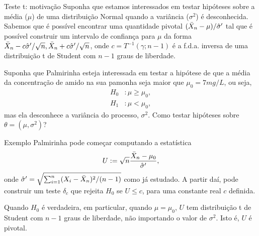 \begin{frame}{Teste t: motivação}
 Suponha que estamos interessados em testar hipóteses sobre a média ($\mu$) de uma distribuição Normal quando a variância ($\sigma^2$) é desconhecida.
 Sabemos que é possível encontrar uma quantidade pivotal $(\bar{X}_n-\mu)/\hat{\sigma}^\prime$ tal que é possível construir um intervalo de confiança para $\mu$ da forma $\bar{X}_n - c\hat{\sigma}^\prime/\sqrt{n}, \bar{X}_n + c\hat{\sigma}^\prime/\sqrt{n}$, onde $c = T^{-1}(\gamma; n-1)$ é a f.d.a. inversa de uma distribuição t de Student com $n-1$ graus de liberdade.
 
 \begin{pergunta}
 \label{qst:unknown_mean_and_variance}
  Suponha que Palmirinha esteja interessada em testar a hipótese de que a média da concentração de amido na sua pamonha seja maior que $\mu_0 = 7 mg/L$, ou seja,
    \begin{align*}
   H_0 &: \mu \geq \mu_0, \\
   H_1&:  \mu < \mu_0,
  \end{align*}
  mas ela desconhece a variância do processo, $\sigma^2$.
  Como testar hipóteses sobre $\theta = (\mu, \sigma^2)$?
 \end{pergunta} 
\end{frame}

\begin{frame}{Exemplo}
 Palmirinha pode começar computando a estatística 
 \begin{equation*}
  U:= \sqrt{n}\frac{\bar{X}_n-\mu_0}{\hat{\sigma}^\prime},
 \end{equation*}
onde $\hat{\sigma}^\prime = \sqrt{\sum_{i=1}^n (X_i - \bar{X}_n)^2/(n-1)}$ como já estudado.
A partir daí, pode construir um teste $\delta_c$ que rejeita $H_0$ se $U \leq c$, para uma constante real $c$ definida.
\begin{obs}
 Quando $H_0$ é verdadeira, em particular, quando $\mu = \mu_0$, $U$ tem distribuição t de Student com $n-1$ graus de liberdade, não importando o valor de $\sigma^2$.
 Isto é, $U$ é pivotal.
\end{obs}
\end{frame}


